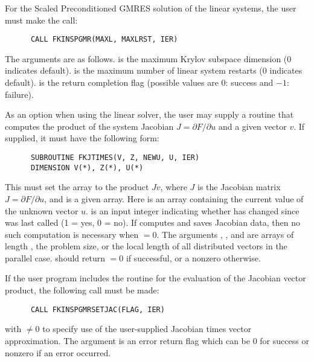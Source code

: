 \begin{Steps}
  For the Scaled Preconditioned GMRES solution of the linear systems,
  the user must make the call:
\begin{verbatim}
      CALL FKINSPGMR(MAXL, MAXLRST, IER)
\end{verbatim}
  The arguments are as follows.
   is the maximum Krylov subspace dimension ($0$ indicates default).
   is the maximum number of linear system restarts ($0$ indicates
  default).
   is the return completion flag (possible values are $0$: success and
  $-1$: failure).
    
  As an option when using the {\spgmr} linear solver, the user may supply a 
  routine that computes the product of the system Jacobian 
  $J = \partial F / \partial u$ 
  and a given vector $v$.  If supplied, it must have the following form:
\begin{verbatim}
      SUBROUTINE FKJTIMES(V, Z, NEWU, U, IER)
      DIMENSION V(*), Z(*), U(*)
\end{verbatim}
  This must set the array  to the product $Jv$, where $J$ is the Jacobian
  matrix $J = \partial F/ \partial u$, and  is a given array. 
  Here  is an array containing
  the current value of the unknown vector $u$.  is an input integer 
  indicating whether  has changed since  was last called 
  (1 = yes, 0 = no). If  computes and saves Jacobian data, then 
  no such computation is necessary when  $= 0$. 
  The arguments , , and  are 
  arrays of length , the problem size, or the local length of all 
  distributed vectors in the parallel case.  should return 
   $= 0$ if successful, or a nonzero  otherwise.
  
  If the user program includes the  routine for the evaluation
  of the Jacobian vector product, the following call must be made:
\begin{verbatim}
      CALL FKINSPGMRSETJAC(FLAG, IER)
\end{verbatim}
  with  $\neq 0$ to specify use of the user-supplied Jacobian times
  vector approximation.
  The argument  is an error return flag which can be $0$ 
  for success or nonzero if an error occurred.
  

\end{Steps}
